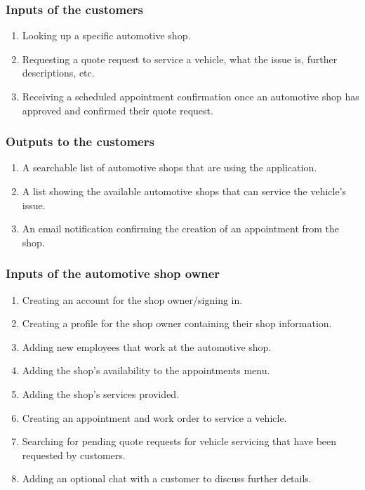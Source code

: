 \documentclass{article}
\begin{document}
\subsubsection{Inputs of the customers}
\begin{enumerate}
    \item Looking up a specific automotive shop.
    \item Requesting a quote request to service a vehicle, what the issue is, further descriptions, etc.
    \item Receiving a scheduled appointment confirmation once an automotive shop has approved and confirmed their quote request.
\end{enumerate}

\subsubsection{Outputs to the customers}
\begin{enumerate}
    \item A searchable list of automotive shops that are using the application.
    \item A list showing the available automotive shops that can service the vehicle's issue.
    \item An email notification confirming the creation of an appointment from the shop.
\end{enumerate}

\subsubsection{Inputs of the automotive shop owner}
\begin{enumerate}
    \item Creating an account for the shop owner/signing in.
    \item Creating a profile for the shop owner containing their shop information.
    \item Adding new employees that work at the automotive shop.
    \item Adding the shop's availability to the appointments menu.
    \item Adding the shop's services provided.
    \item Creating an appointment and work order to service a vehicle.
    \item Searching for pending quote requests for vehicle servicing that have been requested by customers.
    \item Adding an optional chat with a customer to discuss further details.
\end{enumerate}
\end{document}
